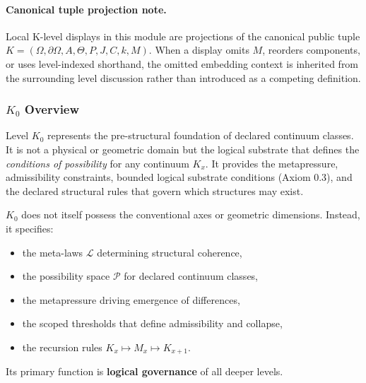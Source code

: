 



\paragraph{Canonical tuple projection note.}
Local K-level displays in this module are projections of the canonical public tuple \(K=(\Omega,\partial\Omega,A,\Theta,P,J,C,k,M)\). When a display omits \(M\), reorders components, or uses level-indexed shorthand, the omitted embedding context is inherited from the surrounding level discussion rather than introduced as a competing definition.

\subsubsection{\texorpdfstring{$K_0$}{K_0} Overview}
\label{sec:k0-overview}

Level $K_0$ represents the pre-structural foundation of declared continuum classes.
It is not a physical or geometric domain but the logical substrate that
defines the \emph{conditions of possibility} for any continuum $K_x$.
It provides the metapressure, admissibility constraints, bounded logical substrate conditions (Axiom 0.3), and the declared structural rules that govern which
structures may exist.

$K_0$ does not itself possess the conventional axes or geometric
dimensions.
Instead, it specifies:
\begin{itemize}
    \item the meta-laws $\mathcal{L}$ determining structural coherence,
    \item the possibility space $\mathcal{P}$ for declared continuum classes,
    \item the metapressure driving emergence of differences,
    \item the scoped thresholds that define admissibility and collapse,
    \item the recursion rules $K_x \mapsto M_x \mapsto K_{x+1}$.
\end{itemize}

Its primary function is \textbf{logical governance} of all deeper
levels.

